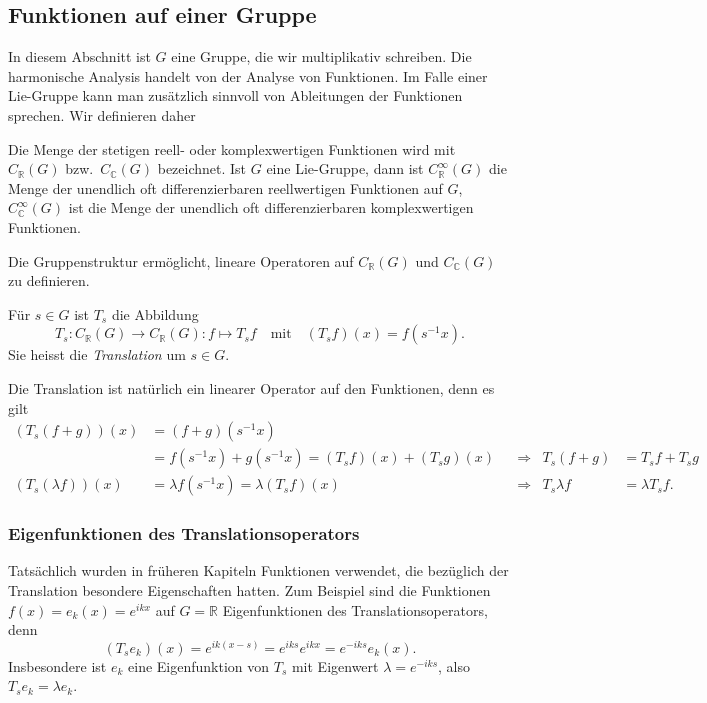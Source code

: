 %
%
%

%
%
\subsection{Funktionen auf einer Gruppe
\label{buch:gruppen:subsection:funktionen}}
In diesem Abschnitt ist $G$ eine Gruppe, die wir multiplikativ
schreiben.
Die harmonische Analysis handelt von der Analyse von Funktionen.
Im Falle einer Lie-Gruppe kann man zusätzlich sinnvoll von Ableitungen
der Funktionen sprechen.
Wir definieren daher

\begin{definition}
\label{buch:gruppen:gruppe:def:funktionenaufgruppe}
Die Menge der stetigen reell- oder komplexwertigen Funktionen wird mit
$C_{\mathbb{R}}(G)$ bzw.~$C_{\mathbb{C}}(G)$ bezeichnet.
Ist $G$ eine Lie-Gruppe, dann ist
$C_{\mathbb{R}}^\infty(G)$ die Menge der unendlich oft differenzierbaren
reellwertigen Funktionen auf $G$,
$C_{\mathbb{C}}^\infty(G)$ ist die Menge der unendlich oft differenzierbaren
komplexwertigen Funktionen.
\end{definition}

Die Gruppenstruktur ermöglicht, lineare Operatoren auf $C_{\mathbb{R}}(G)$
und $C_{\mathbb{C}}(G)$ zu definieren.

\begin{definition}[Translation]
\label{buch:gruppen:gruppe:def:translation}
Für $s\in G$ ist $T_s$ die Abbildung
\[
T_s
\colon
C_{\mathbb{R}}(G) \to C_{\mathbb{R}}(G)
:
f \mapsto T_sf
\quad
\text{mit}
\quad
(T_sf)(x) = f(s^{-1}x).
\]
Sie heisst die {\em Translation} um $s\in G$.
\end{definition}

Die Translation ist natürlich ein linearer Operator auf den Funktionen, denn
es gilt
\begin{align*}
(T_s(f+g))(x)
&=
(f+g)(s^{-1}x)
\\
&=
f(s^{-1}x) + g(s^{-1}x)
=
(T_sf)(x) + (T_sg)(x)
&&\Rightarrow&
T_s(f+g)&=T_sf+T_sg
\\
(T_s(\lambda f))(x)
&=
\lambda f(s^{-1}x)
=
\lambda (T_sf)(x)
&&\Rightarrow&
T_s\lambda f
&=
\lambda T_sf.
\end{align*}

%
%
\subsubsection{Eigenfunktionen des Translationsoperators}
Tatsächlich wurden in früheren Kapiteln Funktionen verwendet, die
bezüglich der Translation besondere Eigenschaften hatten.
Zum Beispiel sind die Funktionen $f(x)=e_k(x)=e^{ikx}$ auf $G=\mathbb{R}$
Eigenfunktionen des Translationsoperators, denn
\[
(T_se_k)(x)
=
e^{ik(x-s)}
=
e^{iks}e^{ikx}
=
e^{-iks} e_k(x).
\]
Insbesondere ist $e_k$ eine Eigenfunktion von $T_s$ mit Eigenwert
$\lambda=e^{-iks}$, also $T_se_k = \lambda e_k$.

